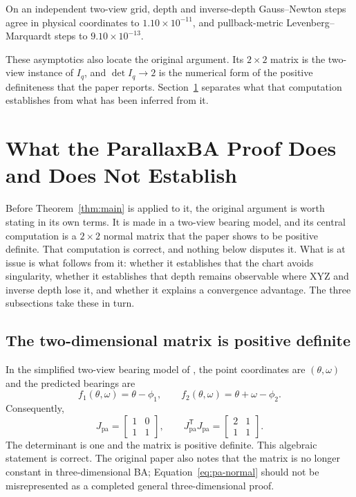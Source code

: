 \documentclass[11pt,a4paper]{article}
\theoremstyle{definition}
\theoremstyle{remark}
\newcommand{\T}{\mathsf{T}}
\begin{document}
On an independent two-view grid, depth and inverse-depth Gauss--Newton steps agree in physical coordinates to $1.10\times10^{-11}$, and pullback-metric Levenberg--Marquardt steps to $9.10\times10^{-13}$.

These asymptotics also locate the original argument. Its $2\times2$ matrix is the two-view instance of $I_q$, and $\det I_q\to2$ is the numerical form of the positive definiteness that the paper reports. Section~\ref{sec:parallaxba} separates what that computation establishes from what has been inferred from it.

\section{What the ParallaxBA Proof Does and Does Not Establish}
\label{sec:parallaxba}

Before Theorem~\ref{thm:main} is applied to it, the original argument is worth stating in its own terms. It is made in a two-view bearing model, and its central computation is a $2\times2$ normal matrix that the paper shows to be positive definite. That computation is correct, and nothing below disputes it. What is at issue is what follows from it: whether it establishes that the chart avoids singularity, whether it establishes that depth remains observable where XYZ and inverse depth lose it, and whether it explains a convergence advantage. The three subsections take these in turn.

\subsection{The two-dimensional matrix is positive definite}
In the simplified two-view bearing model of \citet{zhao2015parallaxba}, the point coordinates are $(\theta,\omega)$ and the predicted bearings are
\begin{equation}
  f_1(\theta,\omega)=\theta-\phi_1,\qquad
  f_2(\theta,\omega)=\theta+\omega-\phi_2.
\end{equation}
Consequently,
\begin{equation}
  J_{\mathrm{pa}}=
  \begin{bmatrix}1&0\\1&1\end{bmatrix},
  \qquad
  J_{\mathrm{pa}}^\T J_{\mathrm{pa}}=
  \begin{bmatrix}2&1\\1&1\end{bmatrix}.
  \label{eq:pa-normal}
\end{equation}
The determinant is one and the matrix is positive definite. This algebraic statement is correct. The original paper also notes that the matrix is no longer constant in three-dimensional BA; Equation~\eqref{eq:pa-normal} should not be misrepresented as a completed general three-dimensional proof.
\end{document}
